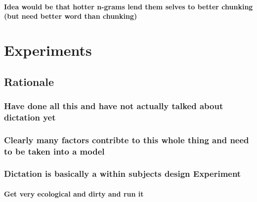 \documentclass[]{book}
\begin{document}
\hypertarget{idea-would-be-that-hotter-n-grams-lend-them-selves-to-better-chunking-but-need-better-word-than-chunking}{%
\subsubsection{Idea would be that hotter n-grams lend them selves to better chunking (but need better word than chunking)}\label{idea-would-be-that-hotter-n-grams-lend-them-selves-to-better-chunking-but-need-better-word-than-chunking}}

\hypertarget{experiments}{%
\chapter{Experiments}\label{experiments}}

\hypertarget{rationale-3}{%
\section{Rationale}\label{rationale-3}}

\hypertarget{have-done-all-this-and-have-not-actually-talked-about-dictation-yet}{%
\subsection{Have done all this and have not actually talked about dictation yet}\label{have-done-all-this-and-have-not-actually-talked-about-dictation-yet}}

\hypertarget{clearly-many-factors-contribte-to-this-whole-thing-and-need-to-be-taken-into-a-model}{%
\subsection{Clearly many factors contribte to this whole thing and need to be taken into a model}\label{clearly-many-factors-contribte-to-this-whole-thing-and-need-to-be-taken-into-a-model}}

\hypertarget{dictation-is-basically-a-within-subjects-design-experiment}{%
\subsection{Dictation is basically a within subjects design Experiment}\label{dictation-is-basically-a-within-subjects-design-experiment}}

\hypertarget{get-very-ecological-and-dirty-and-run-it}{%
\subsubsection{Get very ecological and dirty and run it}\label{get-very-ecological-and-dirty-and-run-it}}
\end{document}
